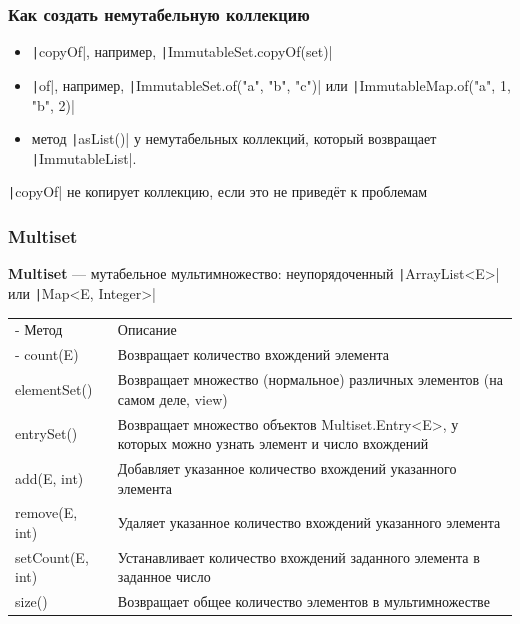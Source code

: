 \documentclass[xetex,mathserif,serif]{beamer}
\begin{document}
	\begin{frame}
		\frametitle{Как создать немутабельную коллекцию}
		\begin{itemize}
			\item \texttt|copyOf|, например, \texttt|ImmutableSet.copyOf(set)|
			\item \texttt|of|, например, \texttt|ImmutableSet.of("a", "b", "c")| или \texttt|ImmutableMap.of("a", 1, "b", 2)|
			\item метод \texttt|asList()| у немутабельных коллекций, который возвращает \texttt|ImmutableList|.
		\end{itemize}
		\texttt|copyOf| не копирует коллекцию, если это не приведёт к проблемам
	\end{frame}

	\begin{frame}
		\frametitle{Multiset}
		\textbf{Multiset} --- мутабельное мультимножество: неупорядоченный \texttt|ArrayList<E>| или \texttt|Map<E, Integer>|
		\vspace{5mm}

		\begin{scriptsize}
			\begin{tabu} {| X[0.4 l p] | X[1 l p] |}
				\tabucline-
				Метод            & Описание                                                                                          \\
				\tabucline-
				\everyrow{\tabucline-}
				count(E)         & Возвращает количество вхождений элемента                                                          \\
				elementSet()     & Возвращает множество (нормальное) различных элементов (на самом деле, view)                       \\
				entrySet()       & Возвращает множество объектов Multiset.Entry<E>, у которых можно узнать элемент и число вхождений \\
				add(E, int)      & Добавляет указанное количество вхождений указанного элемента                                      \\
				remove(E, int)   & Удаляет указанное количество вхождений указанного элемента                                        \\
				setCount(E, int) & Устанавливает количество вхождений заданного элемента в заданное число                            \\
				size()           & Возвращает общее количество элементов в мультимножестве                                           \\
			\end{tabu}
		\end{scriptsize}
	\end{frame}
\end{document}
